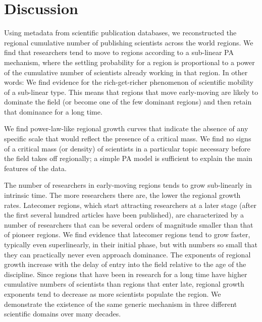 \documentclass[draft,final]{vutinfth} %
\begin{document}

\section{Discussion}
\label{sec:discussion}
Using metadata from scientific publication databases, we reconstructed the regional cumulative number of publishing scientists across the world regions. We find that researchers tend to move to regions according to a sub-linear PA mechanism, where the settling probability for a region is proportional to a power of the cumulative number of scientists already working in that region. In other words: We find evidence for the rich-get-richer phenomenon of scientific mobility of a sub-linear type. This means that regions that move early-moving are likely to dominate the field (or become one of the few dominant regions) and then retain that dominance for a long time.

We find power-law-like regional growth curves that indicate the absence of any specific scale that would reflect the presence of a critical mass. We find no signs of a critical mass (or density) of scientists in a particular topic necessary before the field takes off regionally; a simple PA model is sufficient to explain the main features of the data.

The number of researchers in early-moving regions tends to grow sub-linearly in intrinsic time. The more researchers there are, the lower the regional growth rates. Latecomer regions, which start attracting researchers at a later stage (after the first several hundred articles have been published), are characterized by a number of researchers that can be several orders of magnitude smaller than that of pioneer regions. We find evidence that latecomer regions tend to grow faster, typically even superlinearly, in their initial phase, but with numbers so small that they can practically never even approach dominance. The exponents of regional growth increase with the delay of entry into the field relative to the age of the discipline. Since regions that have been in research for a long time have higher cumulative numbers of scientists than regions that enter late, regional growth exponents tend to decrease as more scientists populate the region. We demonstrate the existence of the same generic mechanism in three different scientific domains over many decades.
\end{document}
